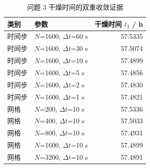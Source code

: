 \begin{table}[H]
\centering
\caption{问题 3 干燥时间的双重收敛证据}
\label{tab:conv3}
\footnotesize
\begin{tabular}{@{}llr@{}}
\toprule
类别 & 参数 & 干燥时间 $t_3$ / h \\
\midrule
时间步 & $N$=1600, $\Delta t$=60 s & 57.5335 \\
时间步 & $N$=1600, $\Delta t$=30 s & 57.5074 \\
时间步 & $N$=1600, $\Delta t$=10 s & 57.4899 \\
时间步 & $N$=1600, $\Delta t$=5 s & 57.4856 \\
时间步 & $N$=1600, $\Delta t$=2 s & 57.4830 \\
时间步 & $N$=1600, $\Delta t$=1 s & 57.4821 \\
网格 & $N$=200, $\Delta t$=10 s & 57.5336 \\
网格 & $N$=400, $\Delta t$=10 s & 57.5033 \\
网格 & $N$=800, $\Delta t$=10 s & 57.4931 \\
网格 & $N$=1600, $\Delta t$=10 s & 57.4899 \\
网格 & $N$=3200, $\Delta t$=10 s & 57.4891 \\
\bottomrule
\end{tabular}
\end{table}
